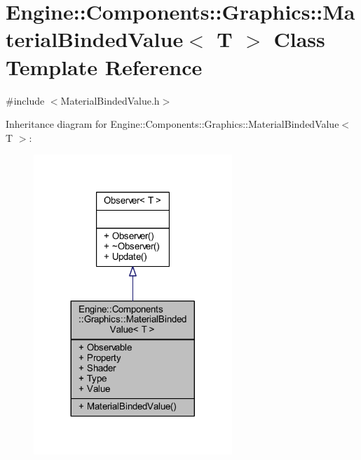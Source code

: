 \hypertarget{classEngine_1_1Components_1_1Graphics_1_1MaterialBindedValue}{}\section{Engine\+:\+:Components\+:\+:Graphics\+:\+:Material\+Binded\+Value$<$ T $>$ Class Template Reference}
\label{classEngine_1_1Components_1_1Graphics_1_1MaterialBindedValue}


{\ttfamily \#include $<$Material\+Binded\+Value.\+h$>$}



Inheritance diagram for Engine\+:\+:Components\+:\+:Graphics\+:\+:Material\+Binded\+Value$<$ T $>$\+:
\nopagebreak
\begin{figure}[H]
\begin{center}
\leavevmode
\includegraphics[width=212pt]{classEngine_1_1Components_1_1Graphics_1_1MaterialBindedValue__inherit__graph}
\end{center}
\end{figure}


